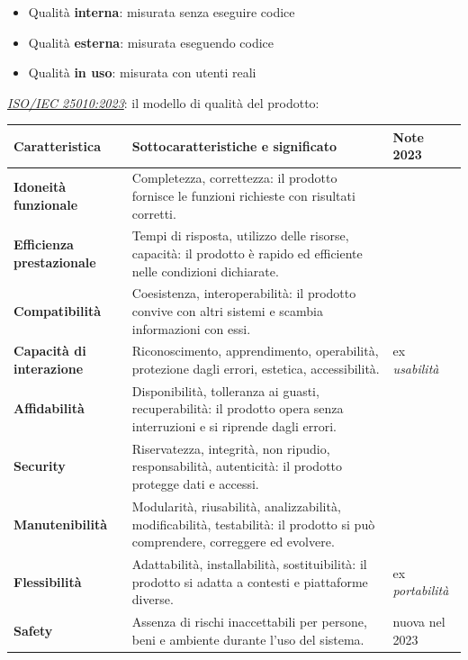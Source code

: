 \documentclass[12pt]{extarticle}
\begin{document}
\begin{itemize}
    \item Qualità \textbf{interna}: misurata senza eseguire codice
    \item Qualità \textbf{esterna}: misurata eseguendo codice
    \item Qualità \textbf{in uso}: misurata con utenti reali
\end{itemize}

\noindent \textit{\underline{ISO/IEC 25010:2023}}: il modello di qualità del prodotto:
\begin{center}
\small
\begin{tabular}{p{3.4cm}p{9.6cm}p{3.0cm}}
    \toprule
    \textbf{Caratteristica} & \textbf{Sottocaratteristiche e significato} & \textbf{Note 2023} \\
    \midrule
    \textbf{Idoneità funzionale} & Completezza, correttezza: il prodotto fornisce le funzioni richieste con risultati corretti. & \\
    \addlinespace
    \textbf{Efficienza prestazionale} & Tempi di risposta, utilizzo delle risorse, capacità: il prodotto è rapido ed efficiente nelle condizioni dichiarate. & \\
    \addlinespace
    \textbf{Compatibilità} & Coesistenza, interoperabilità: il prodotto convive con altri sistemi e scambia informazioni con essi. & \\
    \addlinespace
    \textbf{Capacità di interazione} & Riconoscimento, apprendimento, operabilità, protezione dagli errori, estetica, accessibilità. & ex \textit{usabilità} \\
    \addlinespace
    \textbf{Affidabilità} & Disponibilità, tolleranza ai guasti, recuperabilità: il prodotto opera senza interruzioni e si riprende dagli errori. & \\
    \addlinespace
    \textbf{Security} & Riservatezza, integrità, non ripudio, responsabilità, autenticità: il prodotto protegge dati e accessi. & \\
    \addlinespace
    \textbf{Manutenibilità} & Modularità, riusabilità, analizzabilità, modificabilità, testabilità: il prodotto si può comprendere, correggere ed evolvere. & \\
    \addlinespace
    \textbf{Flessibilità} & Adattabilità, installabilità, sostituibilità: il prodotto si adatta a contesti e piattaforme diverse. & ex \textit{portabilità} \\
    \addlinespace
    \textbf{Safety} & Assenza di rischi inaccettabili per persone, beni e ambiente durante l'uso del sistema. & nuova nel 2023 \\
    \bottomrule
\end{tabular}
\end{center}
\end{document}
